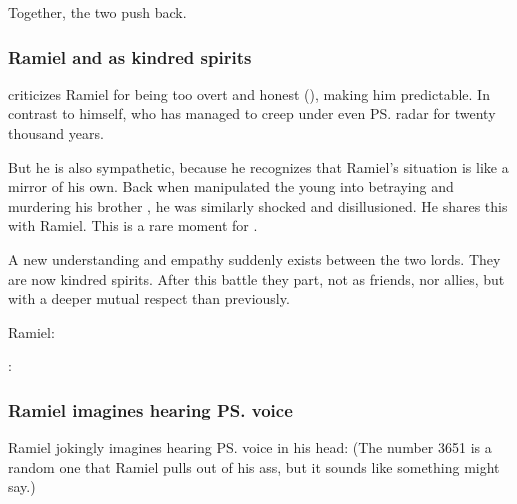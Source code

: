 Together, the two \satharioth{} push \Daggerrain{} back. 





\subsubsection{Ramiel and \Azraid{} as kindred spirits}
\Azraid{} criticizes Ramiel for being too overt and honest (), making him predictable. 
In contrast to \Azraid{} himself, who has managed to creep under even \ps{\Daggerrain}{} radar for twenty thousand years. 

But he is also sympathetic, because he recognizes that Ramiel's situation is like a mirror of his own. 
Back when \Daggerrain{} manipulated the young \Azraid{} into betraying and murdering his brother \Damiarch, he was similarly shocked and disillusioned. 
He shares this with Ramiel. 
This is a rare  moment for \Azraid. 

A new understanding and empathy suddenly exists between the two \resphan{} lords. 
They are now kindred spirits. 
After this battle they part, not as friends, nor allies, but with a deeper mutual respect than previously. 

\begin{prose}
  Ramiel: 

  \Azraid: 
\end{prose}






\subsubsection{Ramiel imagines hearing \ps{\Daggerrain}{} voice}
Ramiel jokingly imagines hearing \ps{\Daggerrain}{} voice in his head: 
(The number 3651 is a random one that Ramiel pulls out of his ass, but it sounds like something \Daggerrain{} might say.)








